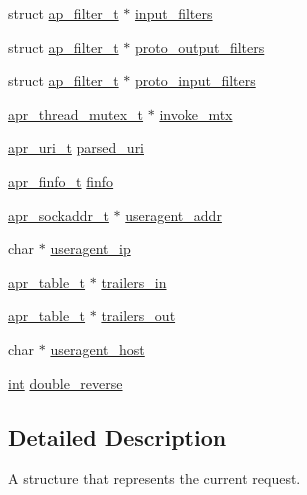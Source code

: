 \begin{DoxyCompactItemize}
\item 
struct \hyperlink{structap__filter__t}{ap\+\_\+filter\+\_\+t} $\ast$ \hyperlink{structrequest__rec_ab1dbefe53c7c3a3e24fe8281bbaea965}{input\+\_\+filters}
\item 
struct \hyperlink{structap__filter__t}{ap\+\_\+filter\+\_\+t} $\ast$ \hyperlink{structrequest__rec_a9f66298f37a3dc652677e832b5f8ffd7}{proto\+\_\+output\+\_\+filters}
\item 
struct \hyperlink{structap__filter__t}{ap\+\_\+filter\+\_\+t} $\ast$ \hyperlink{structrequest__rec_a4fafa030728d5bea176e8acaa38112d9}{proto\+\_\+input\+\_\+filters}
\item 
\hyperlink{structapr__thread__mutex__t}{apr\+\_\+thread\+\_\+mutex\+\_\+t} $\ast$ \hyperlink{structrequest__rec_ae5934a71ef71abf65eaace082d89a170}{invoke\+\_\+mtx}
\item 
\hyperlink{structapr__uri__t}{apr\+\_\+uri\+\_\+t} \hyperlink{structrequest__rec_a778f7883e201095a1d914ab7422635eb}{parsed\+\_\+uri}
\item 
\hyperlink{structapr__finfo__t}{apr\+\_\+finfo\+\_\+t} \hyperlink{structrequest__rec_aa0020e19be2cc5c7c4a385167e3b8d35}{finfo}
\item 
\hyperlink{structapr__sockaddr__t}{apr\+\_\+sockaddr\+\_\+t} $\ast$ \hyperlink{structrequest__rec_a6c9cc65ba522448f726f2bfa75363c10}{useragent\+\_\+addr}
\item 
char $\ast$ \hyperlink{structrequest__rec_a335167cb50483f6015c43e727771c1af}{useragent\+\_\+ip}
\item 
\hyperlink{structapr__table__t}{apr\+\_\+table\+\_\+t} $\ast$ \hyperlink{structrequest__rec_a262f0dcdb72654d48b075baa8c5421c3}{trailers\+\_\+in}
\item 
\hyperlink{structapr__table__t}{apr\+\_\+table\+\_\+t} $\ast$ \hyperlink{structrequest__rec_afb188ac7ef36e5da871eb7d3fb428bc0}{trailers\+\_\+out}
\item 
char $\ast$ \hyperlink{structrequest__rec_a04a1c5a299cb3616a873e51d393850bf}{useragent\+\_\+host}
\item 
\hyperlink{pcre_8txt_a42dfa4ff673c82d8efe7144098fbc198}{int} \hyperlink{structrequest__rec_a3276688038f0dd0f211eb82a28fed8dd}{double\+\_\+reverse}
\end{DoxyCompactItemize}


\subsection{Detailed Description}
A structure that represents the current request. 

